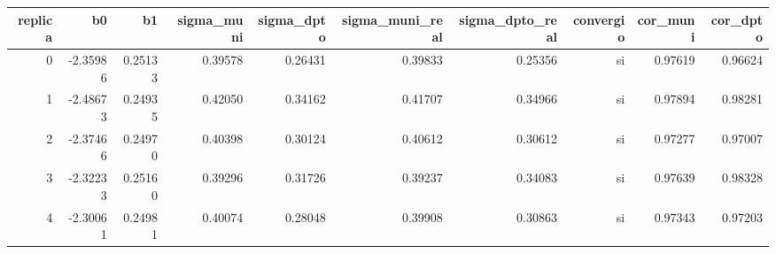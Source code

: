 \begin{tabular}{rrrrrrrrrr}
\toprule
replica & b0 & b1 & sigma\_muni & sigma\_dpto & sigma\_muni\_real & sigma\_dpto\_real & convergio & cor\_muni & cor\_dpto \\
\midrule
0 & -2.35986 & 0.25133 & 0.39578 & 0.26431 & 0.39833 & 0.25356 & si & 0.97619 & 0.96624 \\
1 & -2.48673 & 0.24935 & 0.42050 & 0.34162 & 0.41707 & 0.34966 & si & 0.97894 & 0.98281 \\
2 & -2.37466 & 0.24970 & 0.40398 & 0.30124 & 0.40612 & 0.30612 & si & 0.97277 & 0.97007 \\
3 & -2.32233 & 0.25160 & 0.39296 & 0.31726 & 0.39237 & 0.34083 & si & 0.97639 & 0.98328 \\
4 & -2.30061 & 0.24981 & 0.40074 & 0.28048 & 0.39908 & 0.30863 & si & 0.97343 & 0.97203 \\
\bottomrule
\end{tabular}
